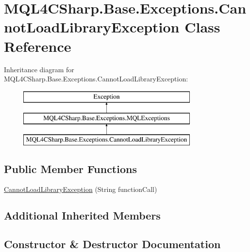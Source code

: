 \hypertarget{class_m_q_l4_c_sharp_1_1_base_1_1_exceptions_1_1_cannot_load_library_exception}{}\section{M\+Q\+L4\+C\+Sharp.\+Base.\+Exceptions.\+Cannot\+Load\+Library\+Exception Class Reference}
\label{class_m_q_l4_c_sharp_1_1_base_1_1_exceptions_1_1_cannot_load_library_exception}
Inheritance diagram for M\+Q\+L4\+C\+Sharp.\+Base.\+Exceptions.\+Cannot\+Load\+Library\+Exception\+:\begin{figure}[H]
\begin{center}
\leavevmode
\includegraphics[height=3.000000cm]{class_m_q_l4_c_sharp_1_1_base_1_1_exceptions_1_1_cannot_load_library_exception}
\end{center}
\end{figure}
\subsection*{Public Member Functions}
\begin{DoxyCompactItemize}
\item 
\hyperlink{class_m_q_l4_c_sharp_1_1_base_1_1_exceptions_1_1_cannot_load_library_exception_ac827d711bf117bb9aa1e517b0cf447a5}{Cannot\+Load\+Library\+Exception} (String function\+Call)
\end{DoxyCompactItemize}
\subsection*{Additional Inherited Members}


\subsection{Constructor \& Destructor Documentation}
